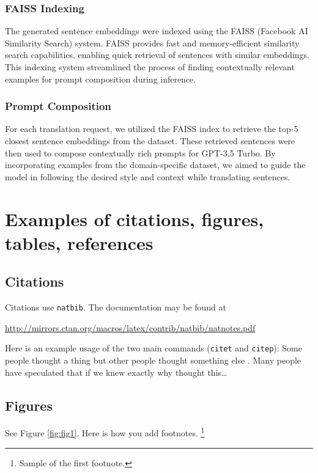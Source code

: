 \documentclass[12pt]{article}
\begin{document}
\subsubsection{FAISS Indexing}

The generated sentence embeddings were indexed using the FAISS (Facebook AI Similarity Search) system. FAISS provides fast and memory-efficient similarity search capabilities, enabling quick retrieval of sentences with similar embeddings. This indexing system streamlined the process of finding contextually relevant examples for prompt composition during inference.


\subsubsection{Prompt Composition}

For each translation request, we utilized the FAISS index to retrieve the top-5 closest sentence embeddings from the dataset. These retrieved sentences were then used to compose contextually rich prompts for GPT-3.5 Turbo. By incorporating examples from the domain-specific dataset, we aimed to guide the model in following the desired style and context while translating sentences.


\section{Examples of citations, figures, tables, references}
\label{sec:others}

\subsection{Citations}
Citations use \verb+natbib+. The documentation may be found at
\begin{center}
	\url{http://mirrors.ctan.org/macros/latex/contrib/natbib/natnotes.pdf}
\end{center}

Here is an example usage of the two main commands (\verb+citet+ and \verb+citep+): Some people thought a thing \citep{kour2014real, hadash2018estimate} but other people thought something else \citep{kour2014fast}. Many people have speculated that if we knew exactly why \citet{kour2014fast} thought this\dots

\subsection{Figures}
\lipsum[10]
See Figure \ref{fig:fig1}. Here is how you add footnotes. \footnote{Sample of the first footnote.}
\lipsum[11]
\end{document}
